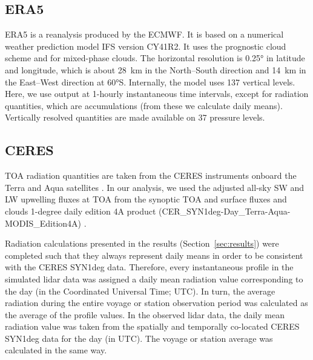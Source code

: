 \documentclass[draft]{agujournal2019}
\begin{document}
\subsection{ERA5}

ERA5 \cite{era5} is a reanalysis produced by the ECMWF. It is based on a numerical weather prediction model IFS version CY41R2. It uses the  prognostic cloud scheme and  for mixed-phase clouds. The horizontal resolution is 0.25° in latitude and longitude, which is about 28~km in the North--South direction and 14~km in the East--West direction at 60°S. Internally, the model uses 137 vertical levels. Here, we use output at 1-hourly instantaneous time intervals, except for radiation quantities, which are accumulations (from these we calculate daily means). Vertically resolved quantities are made available on 37 pressure levels.

\subsection{CERES}

TOA radiation quantities are taken from the CERES instruments onboard the Terra and Aqua satellites \cite{wielicki1996,loeb2018}. In our analysis, we used the adjusted all-sky SW and LW upwelling fluxes at TOA from the synoptic TOA and surface fluxes and clouds 1-degree daily edition 4A product (CER\_SYN1deg-Day\_Terra-Aqua-MODIS\_Edition4A) \cite{doelling2013,doelling2016}.

Radiation calculations presented in the results (Section~\ref{sec:results}) were completed such that they always represent daily means in order to be consistent with the CERES SYN1deg data. Therefore, every instantaneous profile in the simulated lidar data was assigned a daily mean radiation value corresponding to the day (in the Coordinated Universal Time; UTC). In turn, the average radiation during the entire voyage or station observation period was calculated as the average of the profile values. In the observed lidar data, the daily mean radiation value was taken from the spatially and temporally co-located CERES SYN1deg data for the day (in UTC). The voyage or station average was calculated in the same way.
\end{document}
